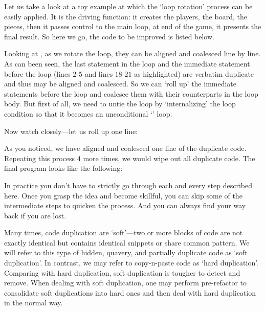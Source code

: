 Let us take a look at a toy example at which the `loop rotation' process can be easily applied.
It is the driving function: it creates the players, the board, the pieces, then it passes
control to the main loop, at end of the game, it presents the final result.
So here we go, the code to be improved is listed below.
\begin{clisting}[H]
    
\end{clisting}
Looking at , as we rotate the loop, they can be aligned and coalesced line by line.
As can been seen, the last statement in the loop and the immediate statement before the loop
(lines $2$-$5$ and lines $18$-$21$ as highlighted)
are verbatim duplicate and thus may be aligned and coalesced.
So we can `roll up' the immediate statements before the loop and coalesce them with their
counterparts in the loop body.
But first of all, we need to untie the loop by `internalizing' the loop condition
so that it becomes an unconditional `' loop:
\begin{clisting}[H]
    
\end{clisting}
Now watch closely---let us roll up one line:
\begin{clisting}[H]
    
\end{clisting}
As you noticed, we have aligned and coalesced one line of the duplicate code.
Repeating this process $4$ more times, we would wipe out all duplicate code.
The final program looks like the following:
\begin{clisting}[H]
    
\end{clisting}
In practice you don't have to strictly go through each and every step described here.
Once you grasp the idea and become skillful, you can skip some of the intermediate steps
to quicken the process.
And you can always find your way back if you are lost.


Many times, code duplication are `soft'---two or more blocks of code are not exactly
identical but contains identical snippets or share common pattern.
We will refer to this type of hidden, quavery, and partially duplicate code as
`soft duplication'.
In contrast, we may refer to copy-n-paste code as `hard duplication'.
Comparing with hard duplication, soft duplication is tougher to detect and remove.
When dealing with soft duplication, one may perform pre-refactor to
consolidate soft duplications into hard ones and then deal with hard duplication in the normal way.



